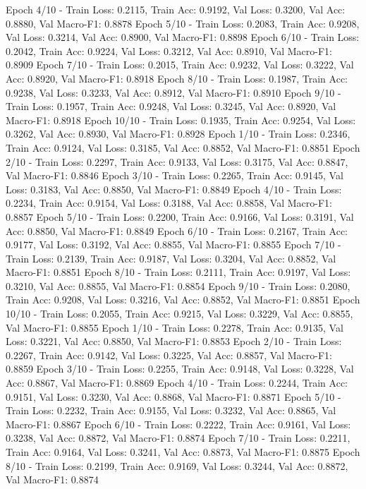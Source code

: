 \documentclass{article}
\begin{document}
Epoch 4/10 - Train Loss: 0.2115, Train Acc: 0.9192, Val Loss: 0.3200, Val Acc: 0.8880, Val Macro-F1: 0.8878
Epoch 5/10 - Train Loss: 0.2083, Train Acc: 0.9208, Val Loss: 0.3214, Val Acc: 0.8900, Val Macro-F1: 0.8898
Epoch 6/10 - Train Loss: 0.2042, Train Acc: 0.9224, Val Loss: 0.3212, Val Acc: 0.8910, Val Macro-F1: 0.8909
Epoch 7/10 - Train Loss: 0.2015, Train Acc: 0.9232, Val Loss: 0.3222, Val Acc: 0.8920, Val Macro-F1: 0.8918
Epoch 8/10 - Train Loss: 0.1987, Train Acc: 0.9238, Val Loss: 0.3233, Val Acc: 0.8912, Val Macro-F1: 0.8910
Epoch 9/10 - Train Loss: 0.1957, Train Acc: 0.9248, Val Loss: 0.3245, Val Acc: 0.8920, Val Macro-F1: 0.8918
Epoch 10/10 - Train Loss: 0.1935, Train Acc: 0.9254, Val Loss: 0.3262, Val Acc: 0.8930, Val Macro-F1: 0.8928
Epoch 1/10 - Train Loss: 0.2346, Train Acc: 0.9124, Val Loss: 0.3185, Val Acc: 0.8852, Val Macro-F1: 0.8851
Epoch 2/10 - Train Loss: 0.2297, Train Acc: 0.9133, Val Loss: 0.3175, Val Acc: 0.8847, Val Macro-F1: 0.8846
Epoch 3/10 - Train Loss: 0.2265, Train Acc: 0.9145, Val Loss: 0.3183, Val Acc: 0.8850, Val Macro-F1: 0.8849
Epoch 4/10 - Train Loss: 0.2234, Train Acc: 0.9154, Val Loss: 0.3188, Val Acc: 0.8858, Val Macro-F1: 0.8857
Epoch 5/10 - Train Loss: 0.2200, Train Acc: 0.9166, Val Loss: 0.3191, Val Acc: 0.8850, Val Macro-F1: 0.8849
Epoch 6/10 - Train Loss: 0.2167, Train Acc: 0.9177, Val Loss: 0.3192, Val Acc: 0.8855, Val Macro-F1: 0.8855
Epoch 7/10 - Train Loss: 0.2139, Train Acc: 0.9187, Val Loss: 0.3204, Val Acc: 0.8852, Val Macro-F1: 0.8851
Epoch 8/10 - Train Loss: 0.2111, Train Acc: 0.9197, Val Loss: 0.3210, Val Acc: 0.8855, Val Macro-F1: 0.8854
Epoch 9/10 - Train Loss: 0.2080, Train Acc: 0.9208, Val Loss: 0.3216, Val Acc: 0.8852, Val Macro-F1: 0.8851
Epoch 10/10 - Train Loss: 0.2055, Train Acc: 0.9215, Val Loss: 0.3229, Val Acc: 0.8855, Val Macro-F1: 0.8855
Epoch 1/10 - Train Loss: 0.2278, Train Acc: 0.9135, Val Loss: 0.3221, Val Acc: 0.8850, Val Macro-F1: 0.8853
Epoch 2/10 - Train Loss: 0.2267, Train Acc: 0.9142, Val Loss: 0.3225, Val Acc: 0.8857, Val Macro-F1: 0.8859
Epoch 3/10 - Train Loss: 0.2255, Train Acc: 0.9148, Val Loss: 0.3228, Val Acc: 0.8867, Val Macro-F1: 0.8869
Epoch 4/10 - Train Loss: 0.2244, Train Acc: 0.9151, Val Loss: 0.3230, Val Acc: 0.8868, Val Macro-F1: 0.8871
Epoch 5/10 - Train Loss: 0.2232, Train Acc: 0.9155, Val Loss: 0.3232, Val Acc: 0.8865, Val Macro-F1: 0.8867
Epoch 6/10 - Train Loss: 0.2222, Train Acc: 0.9161, Val Loss: 0.3238, Val Acc: 0.8872, Val Macro-F1: 0.8874
Epoch 7/10 - Train Loss: 0.2211, Train Acc: 0.9164, Val Loss: 0.3241, Val Acc: 0.8873, Val Macro-F1: 0.8875
Epoch 8/10 - Train Loss: 0.2199, Train Acc: 0.9169, Val Loss: 0.3244, Val Acc: 0.8872, Val Macro-F1: 0.8874
\end{document}
